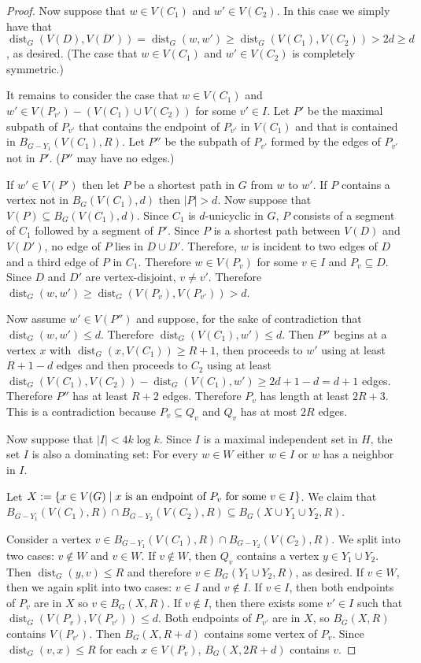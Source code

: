 \documentclass{patmorin}
\DeclareMathOperator{\dist}{dist}
\DeclarePairedDelimiter\set{\{}{\}}
\begin{document}
\begin{proof}
    Now suppose that $w\in V(C_1)$ and $w'\in V(C_2)$. 
    In this case we simply have that 
    $\dist_G(V(D),V(D'))=\dist_G(w,w')\geq \dist_G(V(C_1),V(C_2))>2d\geq d$, as desired.
    (The case that $w\in V(C_1)$ and $w'\in V(C_2)$ is completely symmetric.)

    It remains to consider the case that 
    $w\in V(C_1)$ and $w'\in V(P_{v'})- (V(C_1)\cup V(C_2))$ for some $v'\in I$.  Let $P'$ be the maximal subpath of $P_{v'}$ that contains the endpoint of $P_{v'}$ in $V(C_1)$ and that is contained in $B_{G-Y_1}(V(C_1),R)$. Let $P''$ be the subpath of $P_{v'}$ formed by the edges of $P_{v'}$ not in $P'$.  ($P''$ may have no edges.)
    
    If $w'\in V(P')$ then let $P$ be a shortest path in $G$ from $w$ to $w'$.  If $P$ contains a vertex not in $B_G(V(C_1),d)$ then $|P|> d$. 
    Now suppose that $V(P)\subseteq B_G(V(C_1),d)$. 
    Since $C_1$ is $d$-unicyclic in $G$, $P$ consists of a segment of $C_1$ followed by a segment of $P'$.
    Since $P$ is a shortest path between $V(D)$ and $V(D')$, no edge of $P$ lies in $D\cup D'$.  Therefore, $w$ is incident to two edges of $D$ and a third edge of $P$ in $C_1$.  Therefore $w\in V(P_v)$ for some $v\in I$ and $P_v\subseteq D$.  Since $D$ and $D'$ are vertex-disjoint, $v\neq v'$.  Therefore $\dist_G(w,w')\ge\dist_G(V(P_v),V(P_{v'}))>d$.

    Now assume $w'\in V(P'')$ and suppose, for the sake of contradiction that $\dist_G(w,w')\le d$. Therefore $\dist_G(V(C_1),w')\le d$.  Then $P''$ begins at a vertex $x$ with $\dist_G(x,V(C_1))\ge R+1$, then proceeds to $w'$ using at least $R+1-d$ edges and then proceeds to $C_2$ using at least $\dist_G(V(C_1),V(C_2))-\dist_G(V(C_1),w')\ge 2d+1-d=d+1$ edges.  Therefore $P''$ has at least $R+2$ edges.  Therefore $P_v$ has length at least $2R+3$. This is a contradiction because $P_v\subseteq Q_v$ and $Q_v$ has at most $2R$ edges. 
    
    Now suppose that $|I|<4k\log k$. 
    Since $I$ is a maximal independent set in $H$, the set $I$ is also a dominating set: 
    For every $w\in W$ either $w\in I$ or $w$ has a neighbor in $I$.

    Let $X:=\set{x \in V(G) \mid \textrm{$x$ is an endpoint of $P_v$ for some $v\in I$}}$. 
    We claim that 
    $B_{G-Y_1}(V(C_1),R)\cap B_{G-Y_2}(V(C_2),R)\subseteq B_G(X\cup Y_1\cup Y_2,R)$.

    Consider a vertex $v \in B_{G-Y_1}(V(C_1),R)\cap B_{G-Y_2}(V(C_2),R)$. 
    We split into two cases: $v\not\in W$ and $v\in W$.
    If $v\not\in W$, then $Q_v$ contains a vertex $y \in Y_1\cup Y_2$. 
    Then $\dist_G(y,v) \leq R$ and therefore 
    $v\in B_G(Y_1\cup Y_2,R)$, as desired.
    If $v\in W$, then we again split into two cases: $v\in I$ and $v\notin I$.
    If $v\in I$, then both endpoints of $P_v$ are in $X$ so $v\in B_G(X,R)$.
    If $v\notin I$, then there exists some $v'\in I$ such that $\dist_G(V(P_v),V(P_{v'}))\le d$.  
    Both endpoints of $P_{v'}$ are in $X$, so $B_G(X,R)$ contains $V(P_{v'})$.  Then $B_G(X,R+d)$ contains some vertex of $P_v$.  Since $\dist_G(v,x)\le R$ for each $x\in V(P_v)$, $B_G(X,2R+d)$ contains $v$.
\end{proof}
\end{document}
